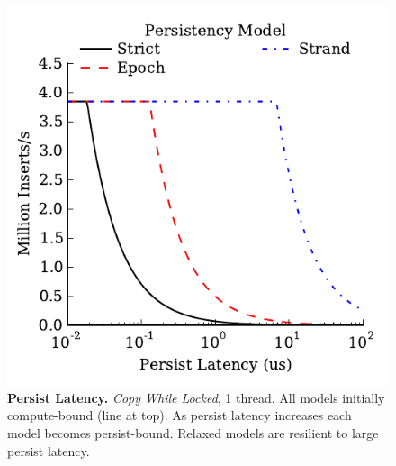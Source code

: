 \begin{figure}
  \centering
  \includegraphics[width=.55\linewidth]{PersistencyEval/Latency1Thread.pdf}
  \caption{\textbf{Persist Latency.} \emph{Copy While Locked}, 1 thread.  All models initially compute-bound (line at top).  As persist latency increases each model becomes persist-bound.  Relaxed models are resilient to large persist latency.}
  \label{fig::RelaxedPerformance}
\end{figure}

